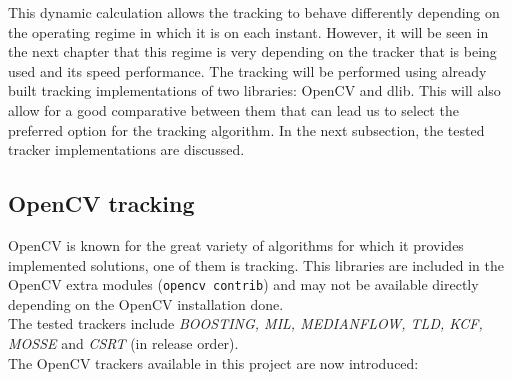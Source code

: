 This dynamic calculation allows the tracking to behave differently depending on the operating regime in which it is on each instant. However, it will be seen in the next chapter that this regime is very depending on the tracker that is being used and its speed performance.
The tracking will be performed using already built tracking implementations of two libraries: OpenCV and dlib. This will also allow for a good comparative between them that can lead us to select the preferred option for the tracking algorithm. In the next subsection, the tested tracker implementations are discussed.
\subsection{OpenCV tracking}
OpenCV is known for the great variety of algorithms for which it provides implemented solutions, one of them is tracking. This libraries are included in the OpenCV extra modules (\texttt{opencv contrib}) and may not be available directly depending on the OpenCV installation done.\\
The tested trackers include \textit{BOOSTING, MIL, MEDIANFLOW, TLD, KCF, MOSSE} and \textit{CSRT} (in release order).
\\
The OpenCV trackers available in this project are now introduced:

